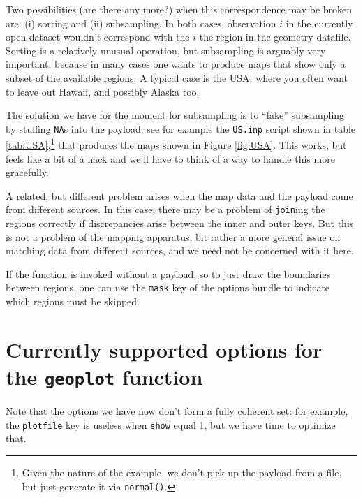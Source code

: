 \documentclass{article}
\begin{document}
Two possibilities (are there any more?) when this correspondence may
be broken are: (i) sorting and (ii) subsampling. In both cases,
observation $i$ in the currently open dataset wouldn't correspond with
the $i$-the region in the geometry datafile. Sorting is a relatively
unusual operation, but subsampling is arguably very important, because
in many cases one wants to produce maps that show only a subset of the
available regions. A typical case is the USA, where you often want to
leave out Hawaii, and possibly Alaska too.

The solution we have for the moment for subsampling is to ``fake''
subsampling by stuffing \texttt{NA}s into the payload: see for example
the \texttt{US.inp} script shown in table
\ref{tab:USA},\footnote{Given the nature of the example, we don't pick
  up the payload from a file, but just generate it via
  \texttt{normal()}.}  that produces the maps shown in Figure
\ref{fig:USA}. This works, but feels like a bit of a hack and we'll
have to think of a way to handle this more gracefully.

A related, but different problem arises when the map data and the
payload come from different sources. In this case, there may be a
problem of \texttt{join}ing the regions correctly if discrepancies
arise between the inner and outer keys. But this is not a problem of
the mapping apparatus, bit rather a more general issue on matching
data from different sources, and we need not be concerned with it
here.

If the  function is invoked without a payload, so to just
draw the boundaries between regions, one can use the \texttt{mask} key
of the options bundle to indicate which regions must be skipped.

\section{Currently supported options for the \texttt{geoplot} function}
\label{sec:opts}

Note that the options we have now don't form a fully coherent set: for
example, the \texttt{plotfile} key is useless when \texttt{show} equal
1, but we have time to optimize that.
\end{document}
